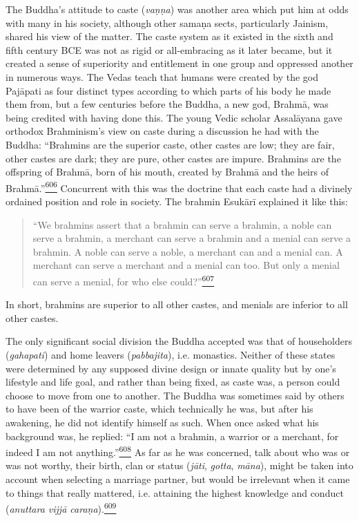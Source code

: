 The Buddha's attitude to caste (\emph{vaṇṇa}) was another area which put
him at odds with many in his society, although other samaṇa sects,
particularly Jainism, shared his view of the matter. The caste system as
it existed in the sixth and fifth century BCE was not as rigid or
all-embracing as it later became, but it created a sense of superiority
and entitlement in one group and oppressed another in numerous ways. The
Vedas teach that humans were created by the god Pajāpati as four
distinct types according to which parts of his body he made them from,
but a few centuries before the Buddha, a new god, Brahmā, was being
credited with having done this. The young Vedic scholar Assalāyana gave
orthodox Brahminism's view on caste during a discussion he had with the
Buddha: ``Brahmins are the superior caste, other castes are low; they
are fair, other castes are dark; they are pure, other castes are impure.
Brahmins are the offspring of Brahmā, born of his mouth, created by
Brahmā and the heirs of
Brahmā.''\label{footprints_split_015.html_fnref606}\hyperref[footprints_split_025.htmlux5cux23fn606]{\textsuperscript{606}}
Concurrent with this was the doctrine that each caste had a divinely
ordained position and role in society. The brahmin Esukārī explained it
like this:

\begin{quote}
``We brahmins assert that a brahmin can serve a brahmin, a noble can
serve a brahmin, a merchant can serve a brahmin and a menial can serve a
brahmin. A noble can serve a noble, a merchant can and a menial can. A
merchant can serve a merchant and a menial can too. But only a menial
can serve a menial, for who else
could?''\label{footprints_split_015.html_fnref607}\hyperref[footprints_split_025.htmlux5cux23fn607]{\textsuperscript{607}}
\end{quote}

In short, brahmins are superior to all other castes, and menials are
inferior to all other castes.

The only significant social division the Buddha accepted was that of
householders (\emph{gahapati}) and home leavers (\emph{pabbajita}), i.e.
monastics. Neither of these states were determined by any supposed
divine design or innate quality but by one's lifestyle and life goal,
and rather than being fixed, as caste was, a person could choose to move
from one to another. The Buddha was sometimes said by others to have
been of the warrior caste, which technically he was, but after his
awakening, he did not identify himself as such. When once asked what his
background was, he replied: ``I am not a brahmin, a warrior or a
merchant, for indeed I am not
anything.''\label{footprints_split_015.html_fnref608}\hyperref[footprints_split_025.htmlux5cux23fn608]{\textsuperscript{608}}
As far as he was concerned, talk about who was or was not worthy, their
birth, clan or status (\emph{jāti}, \emph{gotta}, \emph{māna}), might be
taken into account when selecting a marriage partner, but would be
irrelevant when it came to things that really mattered, i.e. attaining
the highest knowledge and conduct (\emph{anuttara vijjā
caraṇa}).\label{footprints_split_015.html_fnref609}\hyperref[footprints_split_025.htmlux5cux23fn609]{\textsuperscript{609}}

